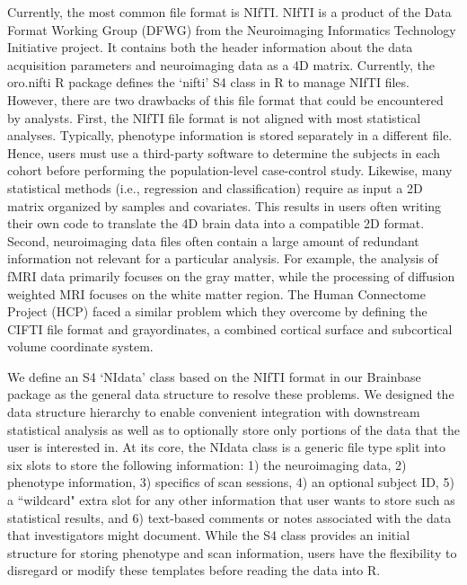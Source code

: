 \documentclass{nature}
\begin{document}
Currently, the most common file format is NIfTI.
NIfTI is a product of the Data Format Working Group
(DFWG) from the Neuroimaging Informatics Technology Initiative project. It
contains both the header information about the data acquisition
parameters and neuroimaging data as a 4D matrix.
Currently, the oro.nifti R package defines the `nifti'
S4 class in R to manage NIfTI files. However, there are two drawbacks
of this file format that could be encountered by analysts. 
First, the NIfTI file format is not aligned with
most statistical analyses. Typically,
phenotype information is stored separately in a different file. Hence, users must use a third-party software to determine the subjects in each cohort before performing the population-level case-control study. Likewise, many
statistical
methods (i.e., regression and classification) require as input a 2D matrix organized by samples and covariates. This results in users often writing 
their own code to translate the 4D brain data 
into a compatible 2D format.
Second, neuroimaging
data files often contain a large amount of
redundant information not relevant for a particular
analysis.
For example,
the analysis of fMRI data primarily focuses on the gray matter, while the
processing of diffusion weighted MRI focuses on the white matter region. The Human Connectome Project (HCP) faced a similar problem which they
overcome by defining the
CIFTI
file format and grayordinates, a combined cortical surface and subcortical
volume coordinate system\cite{Glasser2013The}. 


We define an S4 `NIdata' class based on the NIfTI format
in our Brainbase package as
the general data structure to resolve these problems. We designed
the data structure hierarchy to enable convenient integration with
downstream
statistical analysis as well as to optionally store only portions of the
data that the user is interested in.
At its core, the NIdata class is a generic file type split into
six slots to store the following information: 1) the neuroimaging data,
2) phenotype
information, 3) specifics of scan sessions,  4) an optional subject ID,
5) a ``wildcard" extra slot for any other information that user
wants to store such as statistical results,
and 6) text-based comments or notes associated with the data that
investigators might document. While the
S4 class provides an initial structure for storing
phenotype and scan information, users have the flexibility to disregard or
modify these templates before reading the data into R.
\end{document}
